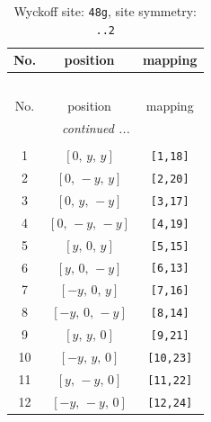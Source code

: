\documentclass[fleqn,8pt]{jsarticle}
\begin{document}
\renewcommand{\arraystretch}{1.2}
\begin{longtable}{ccc}
\caption{Wyckoff site: {\tt 48g}, site symmetry: {\tt ..2}}
 \\
 \hline \hline
No. & position & mapping \\ \hline \endfirsthead

\multicolumn{2}{l}{\tablename\ \thetable{}} \\
 \hline \hline
No. & position & mapping \\ \hline \endhead

 \hline \hline
\multicolumn{2}{r}{\footnotesize\it continued ...} \\ \endfoot

 \hline \hline
\multicolumn{2}{r}{} \\ \endlastfoot

1 & $\left[ 0,\, y,\, y \right]$ & {\tt [1,18]} \\ \hline
2 & $\left[ 0,\, - y,\, y \right]$ & {\tt [2,20]} \\ \hline
3 & $\left[ 0,\, y,\, - y \right]$ & {\tt [3,17]} \\ \hline
4 & $\left[ 0,\, - y,\, - y \right]$ & {\tt [4,19]} \\ \hline
5 & $\left[ y,\, 0,\, y \right]$ & {\tt [5,15]} \\ \hline
6 & $\left[ y,\, 0,\, - y \right]$ & {\tt [6,13]} \\ \hline
7 & $\left[ - y,\, 0,\, y \right]$ & {\tt [7,16]} \\ \hline
8 & $\left[ - y,\, 0,\, - y \right]$ & {\tt [8,14]} \\ \hline
9 & $\left[ y,\, y,\, 0 \right]$ & {\tt [9,21]} \\ \hline
10 & $\left[ - y,\, y,\, 0 \right]$ & {\tt [10,23]} \\ \hline
11 & $\left[ y,\, - y,\, 0 \right]$ & {\tt [11,22]} \\ \hline
12 & $\left[ - y,\, - y,\, 0 \right]$ & {\tt [12,24]} \\
\end{longtable}
\renewcommand{\arraystretch}{1.2}
\end{document}
